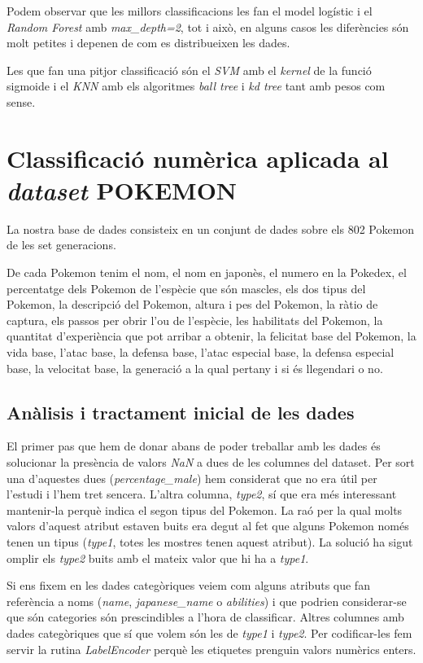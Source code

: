\documentclass[a4paper, 11pt]{article}
\begin{document}
        Podem observar que les millors classificacions les fan el model logístic i el \textit{Random Forest}
        amb \textit{max\_depth=2}, tot i això, en alguns casos les diferències són molt petites i
        depenen de com es distribueixen les dades.

        Les que fan una pitjor classificació són el \textit{SVM} amb el \textit{kernel} de la funció sigmoide
        i el \textit{KNN} amb els algoritmes \textit{ball tree} i \textit{kd tree} tant amb pesos com sense.

    \newpage
    \section{Classificació numèrica aplicada al \textit{dataset} POKEMON}
    La nostra base de dades consisteix en un conjunt de dades sobre els 802 Pokemon de les set
    generacions.

    De cada Pokemon tenim el nom, el nom en japonès, el numero en la Pokedex, el percentatge dels
    Pokemon de l'espècie que són mascles, els dos tipus del Pokemon, la descripció del Pokemon,
    altura i pes del Pokemon, la ràtio de captura, els passos per obrir l'ou de l'espècie, les
    habilitats del Pokemon, la quantitat d'experiència que pot arribar a obtenir, la felicitat base
    del Pokemon, la vida base, l'atac base, la defensa base, l'atac especial base, la defensa
    especial base, la velocitat base, la generació a la qual pertany i si és llegendari o no.

    \subsection{Anàlisis i tractament inicial de les dades}

    El primer pas que hem de donar abans de poder treballar amb les dades és solucionar la presència de valors \textit{NaN} a dues de les columnes del dataset. Per sort una d'aquestes dues (\textit{percentage\_male}) hem considerat que no era útil per l'estudi i l'hem tret sencera. L'altra columna, \textit{type2}, sí que era més interessant mantenir-la perquè indica el segon tipus del Pokemon. La raó per la qual molts valors d'aquest atribut estaven buits era degut al fet que alguns Pokemon només tenen un tipus (\textit{type1}, totes les mostres tenen aquest atribut). La solució ha sigut omplir els \textit{type2} buits amb el mateix valor que hi ha a \textit{type1}.

    Si ens fixem en les dades categòriques veiem com alguns atributs que fan referència a noms (\textit{name}, \textit{japanese\_name} o \textit{abilities}) i que podrien considerar-se que són categories són prescindibles a l'hora de classificar. Altres columnes amb dades categòriques que sí que volem són les de \textit{type1} i \textit{type2}. Per codificar-les fem servir la rutina \textit{LabelEncoder} perquè les etiquetes prenguin valors numèrics enters.
\end{document}
